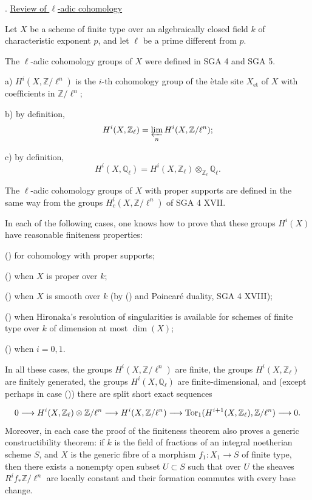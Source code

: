 
. \underline{Review of $\ell$-adic cohomology}

Let $X$ be a scheme of finite type over an algebraically closed field $k$ of characteristic exponent $p$, and let $\ell$ be a prime different from $p$.

The $\ell$-adic cohomology groups of $X$ were defined in SGA 4 and SGA 5.

a) $H^i(X,\mathbb{Z}/\ell^n)$ is the $i$-th cohomology group of the \`etale site $X_{\mathrm{et}}$ of $X$ with coefficients in $\mathbb{Z}/\ell^n$;

b) by definition,
\[
H^i(X,\mathbb{Z}_\ell)=\varprojlim_n H^i(X,\mathbb{Z}/\ell^n);
\]

c) by definition,
\[
H^i(X,\mathbb{Q}_\ell)=H^i(X,\mathbb{Z}_\ell)\otimes_{\mathbb{Z}_\ell}\mathbb{Q}_\ell.
\]

The $\ell$-adic cohomology groups of $X$ with proper supports are defined in the same way from the groups $H^i_c(X,\mathbb{Z}/\ell^n)$ of SGA 4 XVII.

In each of the following cases, one knows how to prove that these groups $H^i(X)$ have reasonable finiteness properties:

() for cohomology with proper supports;

() when $X$ is proper over $k$;

() when $X$ is smooth over $k$ (by () and Poincar\'e duality, SGA 4 XVIII);

() when Hironaka's resolution of singularities is available for schemes of finite type over $k$ of dimension at most $\dim(X)$;

() when $i=0,1$.


In all these cases, the groups $H^i(X,\mathbb{Z}/\ell^n)$ are finite, the groups $H^i(X,\mathbb{Z}_\ell)$ are finitely generated, the groups $H^i(X,\mathbb{Q}_\ell)$ are finite-dimensional, and (except perhaps in case ()) there are split short exact sequences

\begin{equation*}
0 \longrightarrow H^i(X,\mathbb{Z}_\ell)\otimes \mathbb{Z}/\ell^n
\longrightarrow H^i(X,\mathbb{Z}/\ell^n)
\longrightarrow \operatorname{Tor}_1(H^{i+1}(X,\mathbb{Z}_\ell),\mathbb{Z}/\ell^n)
\longrightarrow 0.
\end{equation*}
Moreover, in each case the proof of the finiteness theorem also proves a generic constructibility theorem: if $k$ is the field of fractions of an integral noetherian scheme $S$, and $X$ is the generic fibre of a morphism $f_1:X_1\longrightarrow S$ of finite type, then there exists a nonempty open subset $U\subset S$ such that over $U$ the sheaves $R^i f_*\mathbb{Z}/\ell^n$ are locally constant and their formation commutes with every base change.

